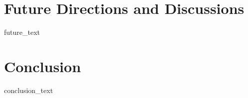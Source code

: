 \documentclass[conference]{IEEEtran}
\begin{document}


\section{Future Directions and Discussions}
{{ future_text }}

\section{Conclusion}
{{ conclusion_text }}


\end{document}
